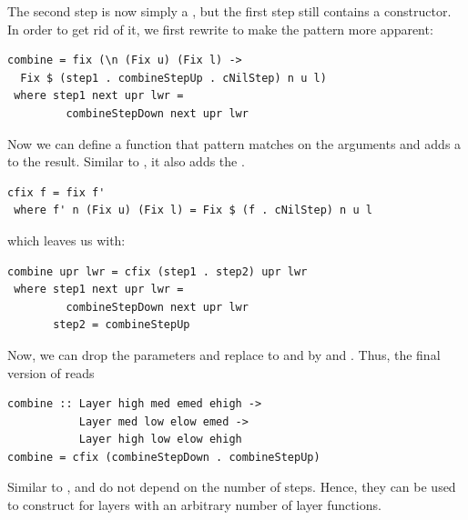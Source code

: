 \documentclass[preprint,natbib]{sigplanconf}
\begin{document}
The second step is now simply a , but the first step still contains a  constructor. In order to get rid of it, we first rewrite  to make the pattern more apparent:

\begin{small}%
\begin{verbatim}
combine = fix (\n (Fix u) (Fix l) -> 
  Fix $ (step1 . combineStepUp . cNilStep) n u l) 
 where step1 next upr lwr = 
         combineStepDown next upr lwr
\end{verbatim}
\end{small}%

Now we can define a function  that pattern matches on the arguments and adds a  to the result. Similar to , it also adds the .

\begin{small}
\begin{verbatim}
cfix f = fix f' 
 where f' n (Fix u) (Fix l) = Fix $ (f . cNilStep) n u l
\end{verbatim}%
\end{small}

which leaves us with:

\begin{small}%
\begin{verbatim}
combine upr lwr = cfix (step1 . step2) upr lwr
 where step1 next upr lwr = 
         combineStepDown next upr lwr
       step2 = combineStepUp
\end{verbatim}
\end{small}


Now, we can drop the parameters and replace to  and  by  and . Thus, the final version of  reads

\begin{small}%
\begin{verbatim}
combine :: Layer high med emed ehigh ->
           Layer med low elow emed -> 
           Layer high low elow ehigh
combine = cfix (combineStepDown . combineStepUp)
\end{verbatim}
\end{small}


Similar to ,  and  do not depend on the number of steps. Hence, they can be used to construct  for layers with an arbitrary number of layer functions.


\end{document}

